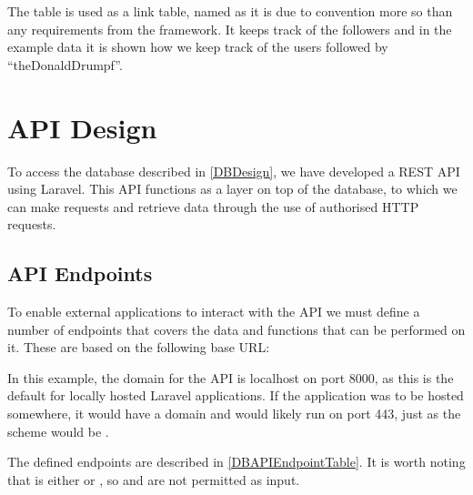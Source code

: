 The table  is used as a link table, named as
it is due to convention more so than any requirements from the framework. It keeps track
of the followers and in the example data it is shown how we keep track of the
users followed by ``theDonaldDrumpf''.

\section{\acs{API} Design}
To access the database described in \autoref{DBDesign}, we have
developed a \ac{REST} \ac{API} using Laravel. This
\ac{API} functions as a layer on top of the database, to which we can make
requests and retrieve data through the use of authorised \ac{HTTP} requests.

\subsection{\acs{API} Endpoints}
To enable external applications to interact with the \ac{API} we must
define a number of endpoints that covers the data and functions that can be
performed on it. These are based on the following base \ac{URL}:\nl

\nl

In this example, the domain for the \ac{API} is localhost on port 8000, as this is
the default for locally hosted Laravel applications. If the application was to
be hosted somewhere, it would have a domain and would likely run on port 443,
just as the scheme would be .\nl

The defined endpoints are described in \autoref{DBAPIEndpointTable}. It is worth
noting that  is either  or , so  and
 are not permitted as input. 

